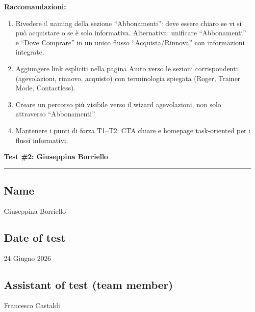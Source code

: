 ﻿\documentclass[11pt,a4paper]{article}
\begin{document}
\begin{tcolorbox}[base]
\noindent\textbf{Raccomandazioni:}
\begin{enumerate}[leftmargin=*]
  \item Rivedere il naming della sezione ``Abbonamenti'':
  deve essere chiaro se vi si può acquistare o se è solo
  informativa. Alternativa: unificare ``Abbonamenti'' e
  ``Dove Comprare'' in un unico flusso ``Acquista/Rinnova''
  con informazioni integrate.
  \item Aggiungere link espliciti nella pagina Aiuto verso
  le sezioni corrispondenti (agevolazioni, rinnovo, acquisto)
  con terminologia spiegata (Roger, Trainer Mode, Contactless).
  \item Creare un percorso più visibile verso il wizard
  agevolazioni, non solo attraverso ``Abbonamenti''.
  \item Mantenere i punti di forza T1--T2: CTA chiare e
  homepage task-oriented per i flussi informativi.
\end{enumerate}
\end{tcolorbox}


\newpage
\begin{center}
  {\color{primaryColor}\large\bfseries Test \#2: Giuseppina Borriello}\\
  \vspace{0.1cm}
  \color{borderColor}\hrule
\end{center}

\vspace{0.5cm}

\subsection*{Name}
\begin{tcolorbox}[base]
Giuseppina Borriello
\end{tcolorbox}

\subsection*{Date of test}
\begin{tcolorbox}[base]
24 Giugno 2026
\end{tcolorbox}

\subsection*{Assistant of test (team member)}
\begin{tcolorbox}[base]
Francesco Castaldi
\end{tcolorbox}
\end{document}
